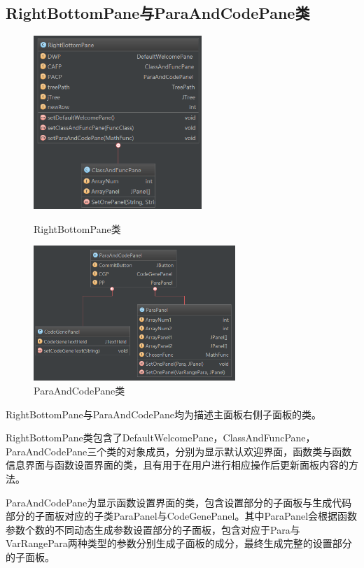 \documentclass[hyperref, UTF8
,bookmarksnumbered=true, oneside]{ctexbook}
\begin{document}
		\subsection{RightBottomPane与ParaAndCodePane类} %
		\label{sub:rightbottompane}

			\begin{figure}[!h]
				\begin{minipage}[b]{0.45\textwidth}
				\centering
				\includegraphics[width=2.5in]{RightBottomPane.png}
				\caption{RightBottomPane类}
				\label{pic:MathPack}
				\end{minipage}%
				\hspace{0.1\textwidth}%
				\begin{minipage}[b]{0.45\textwidth}
				\centering
				\includegraphics[width=3in]{ParaAndCodePane.png}
				\caption{ParaAndCodePane类}
				\label{pic:GUIPack}
				\end{minipage}
			\end{figure}
			
			RightBottomPane与ParaAndCodePane均为描述主面板右侧子面板的类。

			RightBottomPane类包含了DefaultWelcomePane，ClassAndFuncPane，ParaAndCodePane三个类的对象成员，分别为显示默认欢迎界面，函数类与函数信息界面与函数设置界面的类，且有用于在用户进行相应操作后更新面板内容的方法。

			ParaAndCodePane为显示函数设置界面的类，包含设置部分的子面板与生成代码部分的子面板对应的子类ParaPanel与CodeGenePanel。其中ParaPanel会根据函数参数个数的不同动态生成参数设置部分的子面板，包含对应于Para与VarRangePara两种类型的参数分别生成子面板的成分，最终生成完整的设置部分的子面板。
\end{document}
